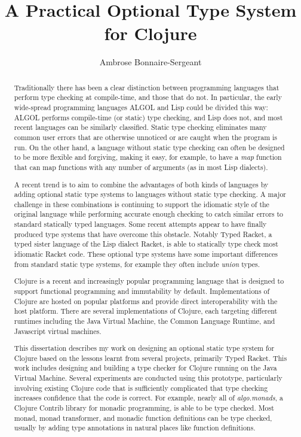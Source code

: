 \documentclass{cshonours}
\title{A Practical Optional Type System for Clojure}
\author{Ambrose Bonnaire-Sergeant}
\begin{document}
\maketitle

\begin{abstract}

Traditionally there has been a clear distinction between 
programming languages that perform type checking at compile-time, and those that do not.
In particular, the early wide-spread programming languages ALGOL and Lisp
could be divided this way: ALGOL performs compile-time (or static) type checking,
and Lisp does not, and most recent languages can be similarly classified.
Static type checking eliminates many common user errors that are otherwise unnoticed or are caught 
when the program is run.
On the other hand, a language without static type checking can often be designed 
to be more flexible and forgiving, making it easy, for example, to have a \emph{map} function that can map functions
with any number of arguments (as in most Lisp dialects).

A recent trend is to aim to combine the advantages of both kinds of languages by adding optional static 
type systems to languages without static type checking. 
A major challenge in these combinations is continuing to support the idiomatic style of the original 
language while performing accurate enough checking to catch similar errors to standard statically
typed languages. Some recent attempts appear to have finally produced type systems that have overcome this obstacle.
Notably Typed Racket, a typed sister language of the Lisp dialect Racket, is able to statically type 
check most idiomatic Racket code.
These optional type systems have some important differences from standard static
type systems, for example they often include \emph{union} types.

Clojure is a recent and increasingly popular programming language that is designed to support 
functional programming and immutability by default. Implementations of Clojure are hosted 
on popular platforms and provide direct interoperability with the host platform.
There are several implementations of Clojure, each targeting different runtimes including
the Java Virtual Machine, the Common Language Runtime, and Javascript virtual machines.

This dissertation describes my work on designing an optional static type system for Clojure based on
the lessons learnt from several projects, primarily Typed Racket.
This work includes designing and building a type checker for Clojure running on the Java Virtual Machine.
Several experiments are conducted using this prototype, particularly involving
existing Clojure code that is sufficiently complicated that
type checking increases confidence that the code is correct.
For example, nearly all of \emph{algo.monads}, a Clojure Contrib library for monadic programming, 
is able to be type checked.
Most monad, monad transformer, and monadic function definitions can be type checked,
usually by adding type annotations in natural places like function definitions.


\end{abstract}
\end{document}
